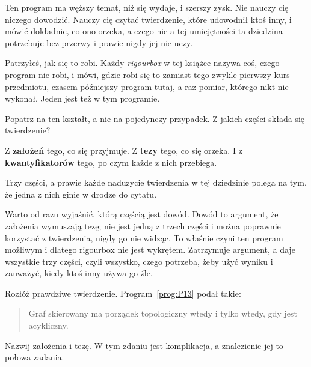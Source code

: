 \begin{fr}
Ten program ma węższy temat, niż się wydaje, i szerszy zysk. Nie nauczy cię
niczego dowodzić. Nauczy cię czytać twierdzenie, które udowodnił ktoś inny, i
mówić dokładnie, co ono orzeka, a czego nie \dash{} a tej umiejętności ta
dziedzina potrzebuje bez przerwy i prawie nigdy jej nie uczy.

Patrzyłeś, jak się to robi. Każdy \emph{rigourbox} w tej książce nazywa coś,
czego program nie robi, i mówi, gdzie robi się to zamiast tego \dash{} zwykle
pierwszy kurs przedmiotu, czasem późniejszy program tutaj, a raz pomiar,
którego nikt nie wykonał. Jeden jest też w tym programie.

Popatrz na ten kształt, a nie na pojedynczy przypadek. Z jakich części składa
się twierdzenie?
\dotline
\nextframe
\end{fr}

\begin{fr}
\begin{ansblock}
Z \textbf{założeń} \dash{} tego, co się przyjmuje. Z \textbf{tezy} \dash{}
tego, co się orzeka. I z \textbf{kwantyfikatorów} \dash{} tego, po czym każde
z nich przebiega.
\end{ansblock}

Trzy części, a prawie każde naduzycie twierdzenia w tej dziedzinie polega na
tym, że jedna z nich ginie w drodze do cytatu.

\begin{note}
Warto od razu wyjaśnić, którą częścią jest dowód. Dowód to argument, że
założenia wymuszają tezę; nie jest jedną z trzech części i można poprawnie
korzystać z twierdzenia, nigdy go nie widząc. To właśnie czyni ten program
możliwym \dash{} i dlatego rigourbox nie jest wykrętem. Zatrzymuje argument, a
daje wszystkie trzy części, czyli wszystko, czego potrzeba, żeby użyć wyniku i
zauważyć, kiedy ktoś inny używa go źle.
\end{note}

\end{fr}

\begin{fr}
Rozłóż prawdziwe twierdzenie. Program~\ref{prog:P13} podał takie:

\begin{quote}
Graf skierowany ma porządek topologiczny wtedy i tylko wtedy, gdy jest
acykliczny.
\end{quote}

Nazwij założenia i tezę. W tym zdaniu jest komplikacja, a znalezienie jej to
połowa zadania.
\dotline
\nextframe
\end{fr}

